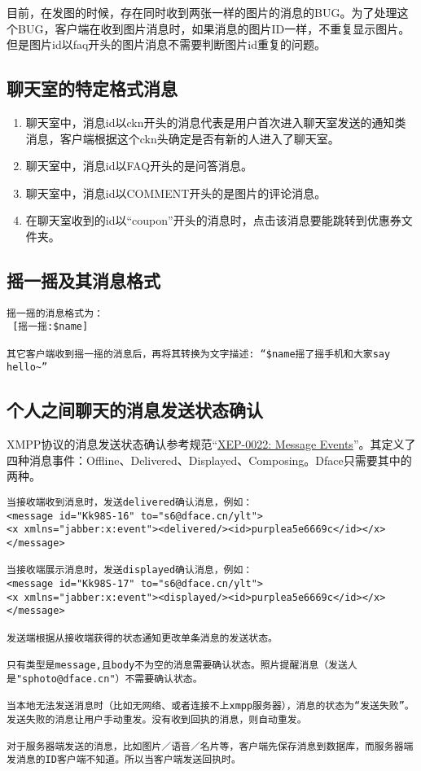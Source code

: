 目前，在发图的时候，存在同时收到两张一样的图片的消息的BUG。为了处理这个BUG，客户端在收到图片消息时，如果消息的图片ID一样，不重复显示图片。但是图片id以faq开头的图片消息不需要判断图片id重复的问题。



\subsection{聊天室的特定格式消息}
\begin{enumerate}
\item 聊天室中，消息id以ckn开头的消息代表是用户首次进入聊天室发送的通知类消息，客户端根据这个ckn头确定是否有新的人进入了聊天室。
\item 聊天室中，消息id以FAQ开头的是问答消息。
\item 聊天室中，消息id以COMMENT开头的是图片的评论消息。
\item 在聊天室收到的id以“coupon”开头的消息时，点击该消息要能跳转到优惠券文件夹。
\end{enumerate}


\subsection{摇一摇及其消息格式}

\begin{verbatim}
摇一摇的消息格式为：
 [摇一摇:$name]

其它客户端收到摇一摇的消息后，再将其转换为文字描述: “$name摇了摇手机和大家say hello~”
\end{verbatim}



\subsection{个人之间聊天的消息发送状态确认}
XMPP协议的消息发送状态确认参考规范“\href{http://xmpp.org/extensions/xep-0022.html}{XEP-0022: Message Events}”。其定义了四种消息事件：Offline、Delivered、Displayed、Composing。Dface只需要其中的两种。

\begin{verbatim}
当接收端收到消息时，发送delivered确认消息，例如：
<message id="Kk98S-16" to="s6@dface.cn/ylt">
<x xmlns="jabber:x:event"><delivered/><id>purplea5e6669c</id></x>
</message>

当接收端展示消息时，发送displayed确认消息，例如：
<message id="Kk98S-17" to="s6@dface.cn/ylt">
<x xmlns="jabber:x:event"><displayed/><id>purplea5e6669c</id></x>
</message>

发送端根据从接收端获得的状态通知更改单条消息的发送状态。

只有类型是message,且body不为空的消息需要确认状态。照片提醒消息（发送人是"sphoto@dface.cn"）不需要确认状态。

当本地无法发送消息时（比如无网络、或者连接不上xmpp服务器），消息的状态为“发送失败”。发送失败的消息让用户手动重发。没有收到回执的消息，则自动重发。

对于服务器端发送的消息，比如图片／语音／名片等，客户端先保存消息到数据库，而服务器端发消息的ID客户端不知道。所以当客户端发送回执时。

\end{verbatim}

